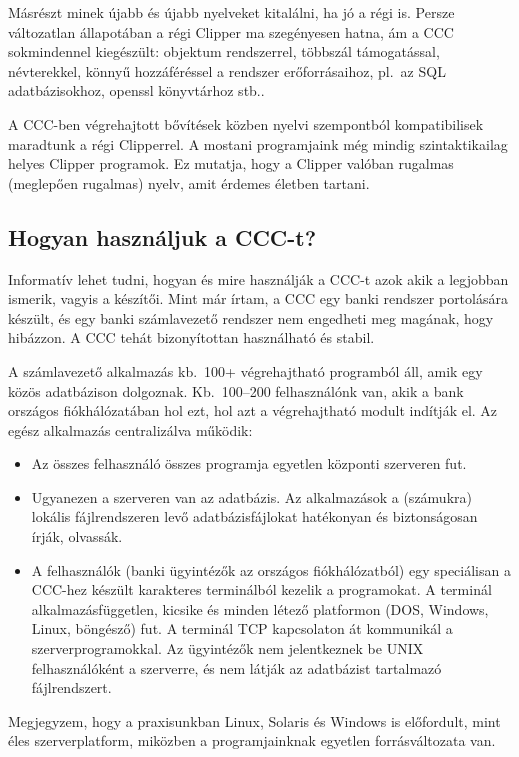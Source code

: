 Másrészt minek újabb és újabb nyelveket kitalálni, ha jó a régi is. 
Persze változatlan állapotában a régi Clipper ma szegényesen hatna, 
ám a CCC sokmindennel kiegészült: 
objektum rendszerrel, 
többszál támogatással, 
névterekkel,
könnyű hozzáféréssel a rendszer erőforrásaihoz, 
pl.\ az SQL adatbázisokhoz, openssl könyvtárhoz stb..

A CCC-ben végrehajtott bővítések közben nyelvi szempontból
kompatibilisek maradtunk a régi Clipperrel. A mostani programjaink még 
mindig szintaktikailag helyes Clipper programok. Ez mutatja, hogy a 
Clipper valóban rugalmas (meglepően rugalmas) nyelv, 
amit érdemes életben tartani.

\subsection{Hogyan használjuk a CCC-t?}

Informatív lehet tudni, hogyan és mire használják a CCC-t azok
akik a legjobban ismerik, vagyis a készítői. Mint már írtam,
a CCC egy banki rendszer portolására készült, és
egy banki számlavezető rendszer nem engedheti meg magának,
hogy hibázzon. A CCC tehát bizonyítottan használható és stabil.

A számlavezető alkalmazás kb.~100+ végrehajtható programból áll, 
amik egy közös adatbázison dolgoznak. Kb.~100--200 felhasználónk van, 
akik a bank országos fiókhálózatában hol ezt, hol azt a végrehajtható 
modult indítják el. Az egész alkalmazás centralizálva működik:
\begin{itemize}
\item
    Az összes felhasználó összes programja egyetlen központi 
    szerveren fut. 
\item
    Ugyanezen a szerveren van az adatbázis.
    Az alkalmazások a (számukra) lokális fájlrendszeren
    levő adatbázisfájlokat hatékonyan és biztonságosan
    írják, olvassák.
\item
    A felhasználók (banki ügyintézők az országos fiókhálózatból) 
    egy speciálisan a CCC-hez készült karakteres terminálból kezelik 
    a programokat.  A terminál alkalmazásfüggetlen, kicsike és  
    minden létező  platformon (DOS, Windows, Linux, böngésző) fut.
    A terminál TCP kapcsolaton át kommunikál a szerverprogramokkal.
    Az ügyintézők nem jelentkeznek be UNIX felhasználóként a szerverre,
    és nem látják az adatbázist tartalmazó fájlrendszert.
\end{itemize}
Megjegyzem, hogy a praxisunkban Linux, Solaris és Windows is
előfordult, mint éles szerverplatform, miközben a programjainknak
egyetlen forrásváltozata van.

